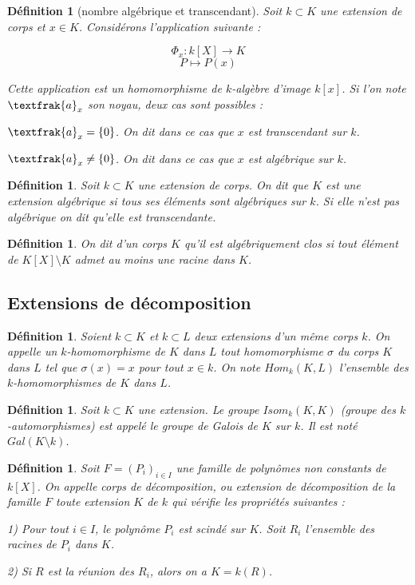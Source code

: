 \documentclass[12pt,a4paper]{report}
\newtheorem{defn}[thm]{\bf D\'efinition}
\begin{document}
\begin{defn}[nombre algébrique et transcendant]\rm
Soit $k\subset K$ une extension de corps et $x\in K$. Considérons l'application suivante : 

$$\Phi_{x} : k[X] \rightarrow K$$
$$P\mapsto P(x)$$

Cette application est un homomorphisme de $k$-algèbre d'image $k[x]$. Si l'on note $\textfrak{a}_{x}$ son noyau, deux cas sont possibles : 

$\textfrak{a}_{x}=\{0\}$. On dit dans ce cas que $x$ est transcendant sur $k$.

$\textfrak{a}_{x}\neq\{0\}$. On dit dans ce cas que $x$ est algébrique sur $k$.

\end{defn}

\begin{defn}\rm
Soit $k\subset K$ une extension de corps. On dit que $K$ est une extension algébrique si tous ses éléments sont algébriques sur $k$. Si elle n'est pas algébrique on dit qu'elle est transcendante. 

\end{defn}

\begin{defn}\rm
On dit d'un corps $K$ qu'il est algébriquement clos si tout élément de $K[X]\setminus K$ admet au moins une racine dans $K$. 

\end{defn}
\subsection{Extensions de décomposition}

\begin{defn}\rm
Soient $k\subset K $ et $k\subset L$ deux extensions d'un même corps $k$. On appelle un $k$-homomorphisme de $K$ dans $L$ tout homomorphisme $\sigma$ du corps $K$ dans $L$ tel que $\sigma(x)=x$ pour tout $x \in k$. On note $Hom_{k}(K,L)$ l'ensemble des $k$-homomorphismes de $K$ dans $L$. 

\end{defn}

\begin{defn}\rm
Soit $k \subset K$ une extension. Le groupe $Isom_{k}(K,K)$ (groupe des $k$-automorphismes) est appelé le groupe de Galois de $K$ sur $k$. Il est noté $Gal(K\setminus k)$. 
\end{defn}

\begin{defn}\rm
Soit $F= (P_{i})_{i\in I}$ une famille de polynômes non constants de $k[X]$. On appelle corps de décomposition, ou extension de décomposition de la famille $F$ toute extension $K$ de $k$ qui vérifie les propriétés suivantes : 

1) Pour tout $i \in I$, le polynôme $P_{i}$ est scindé sur $K$. Soit $R_{i}$ l'ensemble des racines de $P_{i}$ dans $K$. 

2) Si $R$ est la réunion des $R_{i}$, alors on a $K=k(R)$.  

\end{defn}
\end{document}

